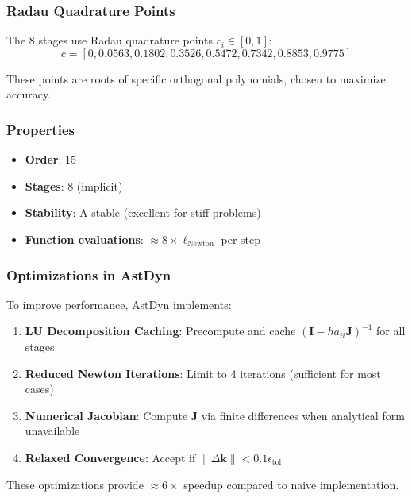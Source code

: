 \subsubsection{Radau Quadrature Points}

The 8 stages use Radau quadrature points $c_i \in [0,1]$:
\begin{equation}
c = [0, 0.0563, 0.1802, 0.3526, 0.5472, 0.7342, 0.8853, 0.9775]
\end{equation}

These points are roots of specific orthogonal polynomials, chosen to maximize accuracy.

\subsubsection{Properties}

\begin{itemize}
    \item \textbf{Order}: 15
    \item \textbf{Stages}: 8 (implicit)
    \item \textbf{Stability}: A-stable (excellent for stiff problems)
    \item \textbf{Function evaluations}: $\approx 8 \times \ell_{\text{Newton}}$ per step
\end{itemize}

\subsubsection{Optimizations in AstDyn}

To improve performance, AstDyn implements:

\begin{enumerate}
    \item \textbf{LU Decomposition Caching}: Precompute and cache $(\mathbf{I} - h a_{ii} \mathbf{J})^{-1}$ for all stages
    \item \textbf{Reduced Newton Iterations}: Limit to 4 iterations (sufficient for most cases)
    \item \textbf{Numerical Jacobian}: Compute $\mathbf{J}$ via finite differences when analytical form unavailable
    \item \textbf{Relaxed Convergence}: Accept if $\|\Delta\mathbf{k}\| < 0.1 \epsilon_{\text{tol}}$
\end{enumerate}

These optimizations provide $\approx 6\times$ speedup compared to naive implementation.

